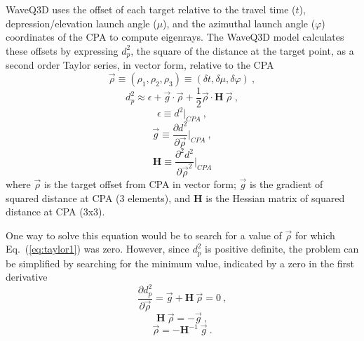 \documentclass{ws-jca}
\begin{document}
WaveQ3D uses the offset of each target relative to the travel time  (\(t\)),
depression/elevation launch angle (\(\mu\)), and the azimuthal launch
angle (\(\varphi\)) coordinates of the CPA to compute eigenrays.
The WaveQ3D model calculates these offsets by expressing \(d^2_{p}\), the square
of the distance at the target point, as a second
order Taylor series, in vector form, relative to the CPA
\begin{equation}
	\vec{\rho} \equiv (\rho_1, \rho_2, \rho_3) 
		\equiv (\delta t, \delta \mu, \delta \varphi) \:,
	\label{eq:rho_defined}
\end{equation}
\begin{equation}
	d^2_{p} \approx \epsilon + \vec{g} \cdot \vec{\rho} 
		+ \frac{1}{2} \vec{\rho} \cdot \mathbf{H} \: \vec{\rho} \:,
	\label{eq:taylor1}
\end{equation}
\begin{equation}
	\epsilon  \equiv d^2 \big|_{CPA} \:,
	\label{eq:taylor2}
\end{equation}
\begin{equation}
	\vec{g} \equiv \frac{\partial d^2}{\partial \vec{\rho} } \big|_{CPA} \:,
	\label{eq:taylor3}
\end{equation}
\begin{equation}
	\mathbf{H} \equiv \frac{\partial^2 d^2}{\partial \vec{\rho}^2 } \big|_{CPA}
	\label{eq:taylor4}
\end{equation}
where 
\(\vec{\rho}\) is the target offset from CPA in vector form;
\(\vec{g}\) is the gradient of squared distance at CPA (3 elements), and
\(\mathbf{H}\) is the Hessian matrix of squared distance at CPA (3x3).

One way to solve this equation would be to search for a value of
\(\vec{\rho}\) for which Eq.~(\ref{eq:taylor1}) was zero. However, since
\(d^2_{p}\) is positive definite, the problem can be simplified by
searching for the minimum value, indicated by a zero in the first
derivative
\begin{equation}
	\frac{\partial d^2_{p}}{\partial \vec{\rho} } 
		= \vec{g} + \mathbf{H} \: \vec{\rho} = 0 \:,
	\label{eq:inverse1}
\end{equation}
\begin{equation}
	\mathbf{H} \: \vec{\rho} = -\vec{g} \:,
	\label{eq:inverse2}
\end{equation}
\begin{equation}
	\vec{\rho} = - \mathbf{H}^{-1} \: \vec{g} \:.
	\label{eq:inverse3}
\end{equation}
\end{document}
